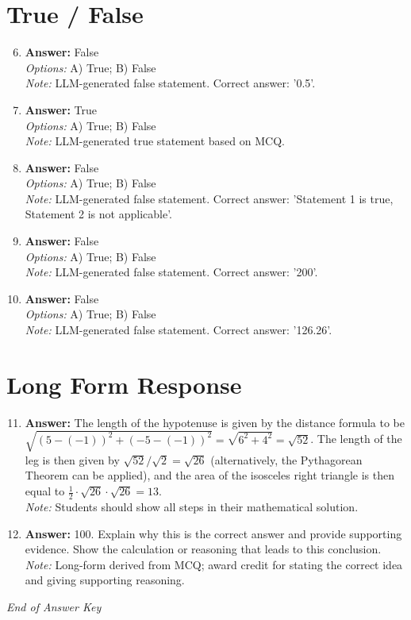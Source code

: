 \documentclass[12pt]{article}
\begin{document}
\section*{True / False}
\begin{enumerate}[label=\arabic*.]
\setcounter{enumi}{5}
\item \textbf{Answer:} False
\\ \textit{Options:} A) True; B) False
\\ \textit{Note:} LLM-generated false statement. Correct answer: '0.5'.
\item \textbf{Answer:} True
\\ \textit{Options:} A) True; B) False
\\ \textit{Note:} LLM-generated true statement based on MCQ.
\item \textbf{Answer:} False
\\ \textit{Options:} A) True; B) False
\\ \textit{Note:} LLM-generated false statement. Correct answer: 'Statement 1 is true, Statement 2 is not applicable'.
\item \textbf{Answer:} False
\\ \textit{Options:} A) True; B) False
\\ \textit{Note:} LLM-generated false statement. Correct answer: '200'.
\item \textbf{Answer:} False
\\ \textit{Options:} A) True; B) False
\\ \textit{Note:} LLM-generated false statement. Correct answer: '126.26'.
\end{enumerate}

\section*{Long Form Response}
\begin{enumerate}[label=\arabic*.]
\setcounter{enumi}{10}
\item \textbf{Answer:} The length of the hypotenuse is given by the distance formula to be $\sqrt{(5-(-1))^2 + (-5-(-1))^2} = \sqrt{6^2+4^2} = \sqrt{52}$. The length of the leg is then given by $\sqrt{52}/\sqrt{2} = \sqrt{26}$ (alternatively, the Pythagorean Theorem can be applied), and the area of the isosceles right triangle is then equal to $\frac 12 \cdot \sqrt{26} \cdot \sqrt{26} = \boxed{13}.$
\\ \textit{Note:} Students should show all steps in their mathematical solution.
\item \textbf{Answer:} 100. Explain why this is the correct answer and provide supporting evidence. Show the calculation or reasoning that leads to this conclusion.
\\ \textit{Note:} Long-form derived from MCQ; award credit for stating the correct idea and giving supporting reasoning.
\end{enumerate}

\vfill
\noindent\textit{End of Answer Key}
\end{document}
